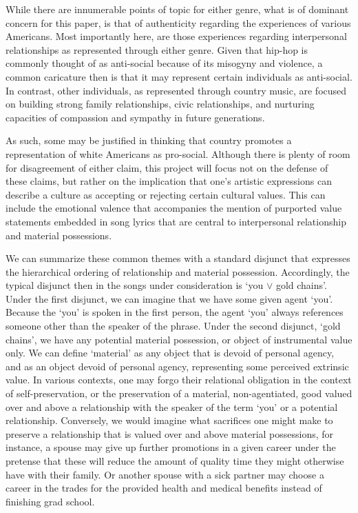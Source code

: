 \documentclass[phdthesis,12pt,final]{wuthesis}
\theoremstyle{definition}
\theoremstyle{definition}
\theoremstyle{definition}
\theoremstyle{definition}
\theoremstyle{remark}
\begin{document}
While there are innumerable points of topic for either genre, what is of dominant concern for this paper, is that of authenticity regarding the experiences of various Americans. Most importantly here, are those experiences regarding interpersonal relationships as represented through either genre. Given that hip-hop is commonly thought of as anti-social because of its misogyny and violence, a common caricature then is that it may represent certain individuals as anti-social. In contrast, other individuals, as represented through country music, are focused on building strong family relationships, civic relationships, and nurturing capacities of compassion and sympathy in future generations.

As such, some may be justified in thinking that country promotes a representation of white Americans as pro-social. Although there is plenty of room for disagreement of either claim, this project will focus not on the defense of these claims, but rather on the implication that one's artistic expressions can describe a culture as accepting or rejecting certain cultural values. This can include the emotional valence that accompanies the mention of purported value statements embedded in song lyrics that are central to interpersonal relationship and material possessions.

We can summarize these common themes with a standard disjunct that expresses the hierarchical ordering of relationship and material possession. Accordingly, the typical disjunct then in the songs under consideration is `you \(\lor\) gold chains'. Under the first disjunct, we can imagine that we have some given agent `you'. Because the `you' is spoken in the first person, the agent `you' always references someone other than the speaker of the phrase. Under the second disjunct, `gold chains', we have any potential material possession, or object of instrumental value only. We can define `material' as any object that is devoid of personal agency, and as an object devoid of personal agency, representing some perceived extrinsic value. In various contexts, one may forgo their relational obligation in the context of self-preservation, or the preservation of a material, non-agentiated, good valued over and above a relationship with the speaker of the term `you' or a potential relationship. Conversely, we would imagine what sacrifices one might make to preserve a relationship that is valued over and above material possessions, for instance, a spouse may give up further promotions in a given career under the pretense that these will reduce the amount of quality time they might otherwise have with their family. Or another spouse with a sick partner may choose a career in the trades for the provided health and medical benefits instead of finishing grad school.
\end{document}
